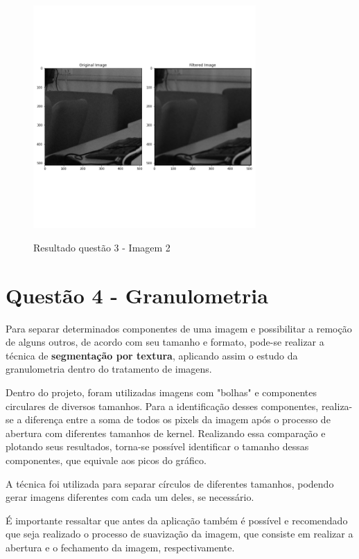 \documentclass{article}
\begin{document}
\begin{figure}[H]
	\label{fig: q3_2}
	\begin{minipage}[b]{1.0\linewidth}
		\centering
		\centerline{\includegraphics[width=8.5cm]{Figures/results3_2}}
		\centerline{Resultado questão 3 - Imagem 2}\medskip	
	\end{minipage}
\end{figure}

\section{Questão 4 - Granulometria}
Para separar determinados componentes de uma imagem e possibilitar a remoção de alguns outros, de acordo com seu tamanho e formato, pode-se realizar a técnica de \textbf{segmentação por textura}, aplicando assim o estudo da granulometria dentro do tratamento de imagens.

Dentro do projeto, foram utilizadas imagens com "bolhas" e componentes circulares de diversos tamanhos. Para a identificação desses componentes, realiza-se a diferença entre a soma de todos os pixels da imagem após o processo de abertura com diferentes tamanhos de kernel. Realizando essa comparação e plotando seus resultados, torna-se possível identificar o tamanho dessas componentes, que equivale aos picos do gráfico. 

A técnica foi utilizada para separar círculos de diferentes tamanhos, podendo gerar imagens diferentes com cada um deles, se necessário.

É importante ressaltar que antes da aplicação também é possível e recomendado que seja realizado o processo de suavização da imagem, que consiste em realizar a abertura e o fechamento da imagem, respectivamente.
\end{document}
